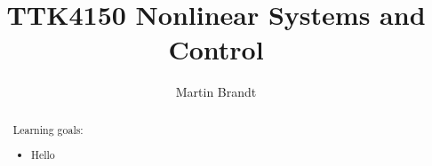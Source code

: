 \documentclass[num-refs]{wiley-networks}
\title{TTK4150 Nonlinear Systems and Control}
\author[1\authfn{1}]{Martin Brandt}
\begin{document}
\renewcommand{\labelitemi}{$*$}

\maketitle


\begin{abstract}
Learning goals:
\begin{itemize}
\item Hello
\end{itemize}
\end{abstract}
\setlength{\parindent}{0pt}
\newpage

\tableofcontents




%
%
\end{document}
